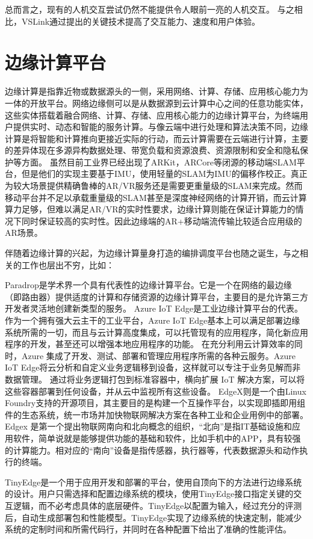总而言之，现有的人机交互尝试仍然不能提供令人眼前一亮的人机交互。
与之相比，VSLink通过提出的关键技术提高了交互能力、速度和用户体验。

\section{边缘计算平台}
边缘计算是指靠近物或数据源头的一侧，采用网络、计算、存储、应用核心能力为一体的开放平台。网络边缘侧可以是从数据源到云计算中心之间的任意功能实体，这些实体搭载着融合网络、计算、存储、应用核心能力的边缘计算平台，为终端用户提供实时、动态和智能的服务计算。与像云端中进行处理和算法决策不同，边缘计算是将智能和计算推向更接近实际的行动，而云计算需要在云端进行计算，主要的差异体现在多源异构数据处理、带宽负载和资源浪费、资源限制和安全和隐私保护等方面。
虽然目前工业界已经出现了ARKit，ARCore等闭源的移动端SLAM平台，但是他们的实现主要基于IMU，使用轻量的SLAM为IMU的偏移作校正。真正为较大场景提供精确鲁棒的AR/VR服务还是需要更重量级的SLAM来完成。然而移动平台并不足以承载重量级的SLAM甚至是深度神经网络的计算开销，而云计算算力足够，但难以满足AR/VR的实时性要求，边缘计算则能在保证计算能力的情况下同时保证较高的实时性。因此边缘端的AR+移动端流传输比较适合应用级的AR场景。

伴随着边缘计算的兴起，为边缘计算量身打造的编排调度平台也随之诞生，与之相关的工作也层出不穷，比如：

Paradrop\cite{WilDasBan14,WilDasBan142,LiuWilBan16,Ban18}是学术界一个具有代表性的边缘计算平台。它是一个在网络的最边缘（即路由器）提供适度的计算和存储资源的边缘计算平台，主要目的是允许第三方开发者灵活地创建新类型的服务。
Azure IoT Edge\cite{AzureIoTEdge}是工业边缘计算平台的代表。作为一个拥有强大云主干的工业平台，Azure IoT Edge基本上可以满足部署边缘系统所需的一切，而且与云计算高度集成，可以托管现有的应用程序，简化新应用程序的开发，甚至还可以增强本地应用程序的功能。 在充分利用云计算效率的同时，Azure 集成了开发、测试、部署和管理应用程序所需的各种云服务。Azure IoT Edge将云分析和自定义业务逻辑移到设备，这样就可以专注于业务见解而非数据管理。 通过将业务逻辑打包到标准容器中，横向扩展 IoT 解决方案，可以将这些容器部署到任何设备，并从云中监视所有这些设备。
EdgeX\cite{EdgeXFoundry}则是一个由Linux Foundry支持的开源项目，其主要目的是构建一个互操作平台，以实现即插即用组件的生态系统，统一市场并加快物联网解决方案在各种工业和企业用例中的部署。Edgex 是第一个提出物联网南向和北向概念的组织，“北向”是指IT基础设施和应用软件，简单说就是能够提供功能的基础和软件，比如手机中的APP，具有较强的计算能力。相对应的“南向”设备是指传感器，执行器等，代表数据源头和动作执行的终端。

TinyEdge\cite{ZhaZhaFan20}是一个用于应用开发和部署的平台，使用自顶向下的方法进行边缘系统的设计。用户只需选择和配置边缘系统的模块，使用TinyEdge接口指定关键的交互逻辑，而不必考虑具体的底层硬件。TinyEdge以配置为输入，经过充分的评测后，自动生成部署包和性能模型。TinyEdge实现了边缘系统的快速定制，能减少系统的定制时间和所需代码行，并同时在各种配置下给出了准确的性能评估。


